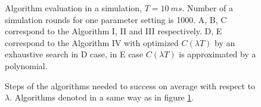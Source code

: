 \documentclass{acm_proc_article-sp}
\begin{document}
\begin{figure}%
{}
\caption{Algorithm evaluation in a simulation, $T=10~ms$. Number of a simulation rounds for one parameter setting is 1000.
 A, B, C correspond to the Algorithm I, II and III respectively.
 D, E correspond to the Algorithm IV with optimized $C(\lambda T)$ by an exhaustive search in D case, 
 in E case $C(\lambda T)$ is approximated by a polynomial.}
\label{fig:alg_eval}
\end{figure}
    
\begin{figure}%
{}
\caption{Steps of the algorithms needed to success on average with respect to $\lambda$. Algorithms denoted in a same way as in figure \ref{fig:alg_eval}.}
\label{fig:alg_steps}
\end{figure}
\end{document}
